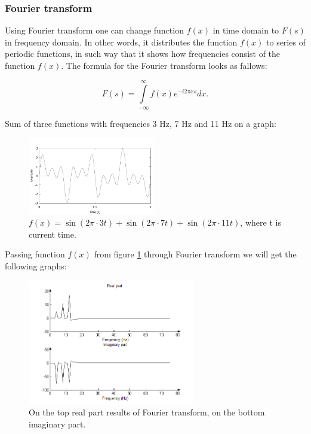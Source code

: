 \documentclass[11pt,titlepage]{article}
\theoremstyle{plain}
\begin{document}
\subsubsection{Fourier transform}
Using Fourier transform one can change function $f(x)$ in time domain to $F(s)$ in frequency domain. In other words, it distributes the function $f(x)$ to series of periodic functions, in such way that it shows how frequencies consist of the function $f(x)$. The formula for the Fourier transform looks as fallows:

\begin{equation}
	F(s) = \int\limits^\infty_{-\infty} f(x) e^{-i2\pi xs} dx.
\end{equation}

Sum of three functions with frequencies 3 Hz, 7 Hz and 11 Hz on a graph:
\begin{figure}[H]
	\centering
	\includegraphics[width=0.5\textwidth]{img/sines}
	\caption{$f(x) = \sin(2\pi \cdot 3t)+\sin(2 \pi \cdot 7 t)+\sin(2  \pi \cdot 11  t)$, where t is current time.}
	\label{fig:F4}
\end{figure}

Passing function $f(x)$ from figure \ref{fig:F4} through Fourier transform we will get the following graphs:

\begin{figure}[H]
	\centering
	\includegraphics[width=0.65\textwidth]{img/both_real_imag}
	\caption{On the top real part results of Fourier transform, on the bottom imaginary part.}
	\label{fig:F5}
\end{figure}
\end{document}
